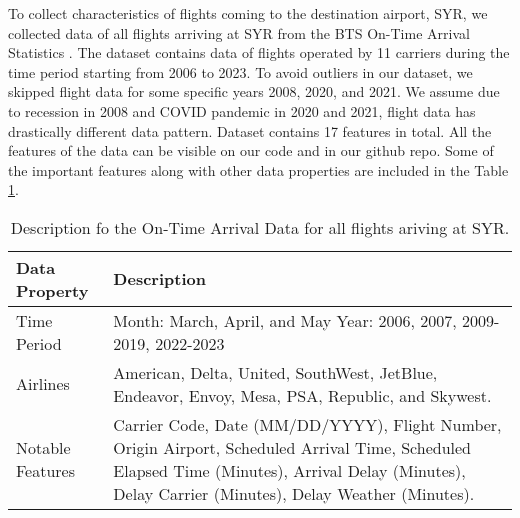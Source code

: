 To collect characteristics of flights coming to the destination airport, SYR, we collected data of all flights arriving at SYR from the BTS On-Time Arrival Statistics \cite{btsOnTimeArrival}. 
The dataset contains data of flights operated by 11 carriers during the time period starting from 2006 to 2023.
To avoid outliers in our dataset, we skipped flight data for some specific years 2008, 2020, and 2021.
We assume due to recession in 2008 and COVID pandemic in 2020 and 2021, flight data has drastically different data pattern.
Dataset contains 17 features in total. All the features of the data can be visible on our code and in our github repo. Some of the important features along with other data properties are included in the Table \ref{tab:arrival_data}.
\begin{table}[htbp]
	\centering
	\caption{Description fo the On-Time Arrival Data for all flights ariving at SYR.}
	\begin{tabular}{| p{3.85cm}|p{3.85cm} |}
		\hline
		Data Property & Description \\
		\hline
		\hline
		Time Period & Month: March, April, and May \newline Year: 2006, 2007, 2009-2019, 2022-2023 \\
		\hline
		Airlines & American, Delta, United, SouthWest, JetBlue, Endeavor, Envoy, Mesa, PSA, Republic, and Skywest. \\
		\hline
		Notable Features & Carrier Code, Date (MM/DD/YYYY), Flight Number, Origin Airport, Scheduled Arrival Time, Scheduled Elapsed Time (Minutes),  Arrival Delay (Minutes), Delay Carrier (Minutes), Delay Weather (Minutes).\\
		\hline
	\end{tabular}
	\label{tab:arrival_data}
\end{table}

